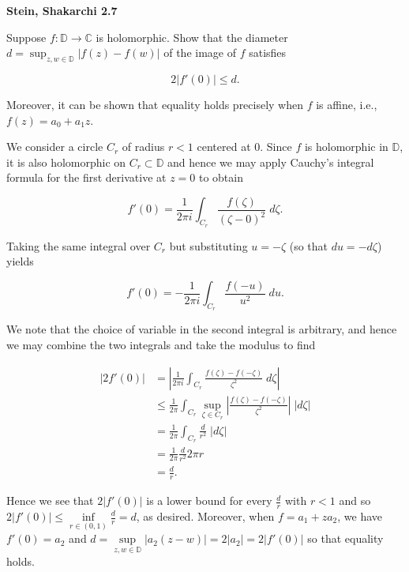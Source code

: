 \textbf{Stein, Shakarchi 2.7}

Suppose $f : \mathbb{D} \to \mathbb{C}$ is holomorphic. Show that the diameter 
$d = \sup_{z,w \in \mathbb{D}} |f(z) - f(w)|$ of the image of $f$ satisfies

$$
2 \left| f'(0) \right| \le d.
$$

Moreover, it can be shown that equality holds precisely when $f$ is affine, i.e., $f(z) = a_0 + a_1 z$.

\begin{solution}
    We consider a circle $C_r$ of radius $r < 1$ centered at $0$. Since $f$ is holomorphic in $\mathbb{D}$, it is 
    also holomorphic on $C_r \subset \mathbb{D}$ and hence we may apply Cauchy's integral formula for the first 
    derivative at $z = 0$ to obtain

    $$
    f'(0) = \frac{1}{2 \pi i} \int_{C_r} \frac{f(\zeta)}{(\zeta - 0)^{2}} \; d\zeta.
    $$

    Taking the same integral over $C_r$ but substituting $u = -\zeta$ (so that $du = -d\zeta$) yields

    $$
    f'(0) = -\frac{1}{2 \pi i} \int_{C_r} \frac{f(-u)}{u^{2}} \; du.
    $$

    We note that the choice of variable in the second integral is arbitrary, and hence we may combine the two integrals
    and take the modulus to find

    \begin{align*}
      \left| 2 f'(0) \right| &=   \left| \frac{1}{2 \pi i} \int_{C_r} \frac{f(\zeta) - f(-\zeta)}{\zeta^{2}} \; d\zeta \right| \\
                             &\le \frac{1}{2 \pi} \int_{C_r} \sup\limits_{\zeta \in C_r}{\left| \frac{f(\zeta) - f(-\zeta)}{\zeta^{2}} \right|} \; |d\zeta| \\
                             &=   \frac{1}{2 \pi} \int_{C_r} \frac{d}{r^2} \; |d\zeta| \\
                             &=   \frac{1}{2 \pi} \frac{d}{r^2} 2 \pi r \\
                             &=   \frac{d}{r}.
    \end{align*}

    Hence we see that $2 \left| f'(0) \right|$ is a lower bound for every $\frac{d}{r}$ with $r < 1$ and so \linebreak
    $2 \left| f'(0) \right| \le \inf\limits_{r \in (0, 1)} {\frac{d}{r}} = d$, as desired. Moreover, when 
    $f = a_1 + z a_2$, we have $f'(0) = a_2$ and $d = \sup\limits_{z, w \in \mathbb{D}} |a_2 (z - w)| = 2 |a_2| = 2|f'(0)|$
    so that equality holds.
    \ \\
\end{solution}
